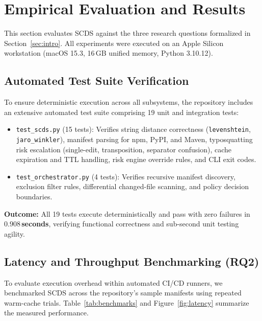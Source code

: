 \section{Empirical Evaluation and Results}
\label{sec:eval}

This section evaluates SCDS against the three research questions formalized in Section~\ref{sec:intro}. All experiments were executed on an Apple Silicon workstation (macOS 15.3, 16\,GB unified memory, Python 3.10.12).

\subsection{Automated Test Suite Verification}
To ensure deterministic execution across all subsystems, the repository includes an extensive automated test suite comprising 19 unit and integration tests:
\begin{itemize}
    \item \texttt{test\_scds.py} (15 tests): Verifies string distance correctness (\texttt{levenshtein}, \texttt{jaro\_winkler}), manifest parsing for npm, PyPI, and Maven, typosquatting risk escalation (single-edit, transposition, separator confusion), cache expiration and TTL handling, risk engine override rules, and CLI exit codes.
    \item \texttt{test\_orchestrator.py} (4 tests): Verifies recursive manifest discovery, exclusion filter rules, differential changed-file scanning, and policy decision boundaries.
\end{itemize}
\textbf{Outcome:} All 19 tests execute deterministically and pass with zero failures in \textbf{$0.908$\,seconds}, verifying functional correctness and sub-second unit testing agility.

\subsection{Latency and Throughput Benchmarking (RQ2)}
To evaluate execution overhead within automated CI/CD runners, we benchmarked SCDS across the repository's sample manifests using repeated warm-cache trials. Table~\ref{tab:benchmarks} and Figure~\ref{fig:latency} summarize the measured performance.

\begin{table}[h]
\centering
\caption{Measured manifest scan latency and risk summary across ecosystems.}
\label{tab:benchmarks}
\end{table}

